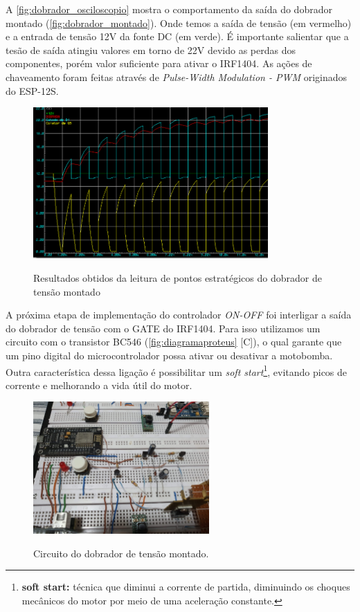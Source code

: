 A \autoref{fig:dobrador_osciloscopio} mostra o comportamento da saída do dobrador montado (\autoref{fig:dobrador_montado}). Onde temos a saída de tensão (em vermelho) e a entrada de tensão 12V da fonte DC (em verde). É importante salientar que a tesão de saída atingiu valores em torno de 22V devido as perdas dos componentes, porém valor suficiente para ativar o IRF1404.
As ações de chaveamento foram feitas através de \textit{Pulse-Width Modulation - PWM} originados do ESP-12S.
\begin{figure}[H]
	\centering
	\caption{Resultados obtidos da leitura de pontos estratégicos do dobrador de tensão montado}
	\includegraphics[width=0.8\textwidth]{figuras/dobrador.png}
	\label{fig:dobrador_osciloscopio}
\end{figure}

A próxima etapa de implementação do controlador \textit{ON-OFF} foi interligar a saída do dobrador de tensão com o GATE do IRF1404. Para isso utilizamos um circuito com o transistor BC546 (\autoref{fig:diagramaproteus} [C]), o qual garante que um pino digital do microcontrolador possa ativar ou desativar a motobomba. Outra característica dessa ligação é possibilitar um \textit{soft start}\footnote{\textbf{soft start:} técnica que diminui a corrente de partida, diminuindo os choques mecânicos do motor por meio de uma aceleração constante.}, evitando picos de corrente e melhorando a vida útil do motor.

\begin{figure}[H]
	\centering
	\caption{Circuito do dobrador de tensão montado.}
	\includegraphics[width=0.6\textwidth]{figuras/dobrador_montado.jpg}
	\label{fig:dobrador_montado}
\end{figure} 





